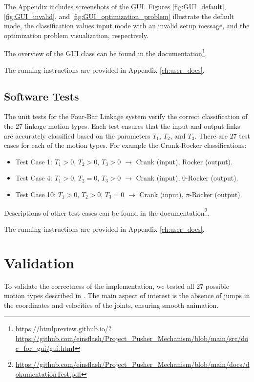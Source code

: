 \documentclass{article}
\begin{document}
The Appendix includes screenshots of the GUI. Figures \ref{fig:GUI_default}, \ref{fig:GUI_invalid}, and \ref{fig:GUI_optimization_problem} illustrate the default mode, the classification values input mode with an invalid setup message, and the optimization problem visualization, respectively.

The overview of the GUI class can be found in the documentation\footnote{\url{https://htmlpreview.github.io/?https://github.com/einsflash/Project_Pusher_Mechanism/blob/main/src/doc_for_gui/gui.html}}.

The running instructions are provided in Appendix \ref{ch:user_docs}.

\subsection{Software Tests}

The unit tests for the Four-Bar Linkage system verify the correct classification of the $27$ linkage motion types. Each test ensures that the input and output links are accurately classified based on the parameters $T_1$, $T_2$, and $T_3$. There are $27$ test cases for each of the motion types. For example the Crank-Rocker classifications:

\begin{itemize}
	\item Test Case 1: $T_1 > 0$, $T_2 > 0$, $T_3 > 0$ $\rightarrow$ Crank (input), Rocker (output).
	\item Test Case 4: $T_1 > 0$, $T_2 = 0$, $T_3 > 0$ $\rightarrow$ Crank (input), 0-Rocker (output).
	\item Test Case 10: $T_1 > 0$, $T_2 > 0$, $T_3 = 0$ $\rightarrow$ Crank (input), \(\pi\)-Rocker (output).
\end{itemize}

Descriptions of other test cases can be found in the documentation\footnote{\url{https://github.com/einsflash/Project_Pusher_Mechanism/blob/main/docs/dokumentationTest.pdf}}.

The running instructions are provided in Appendix \ref{ch:user_docs}.

\section{Validation}\label{ch:validation}

To validate the correctness of the implementation, we tested all $27$ possible motion types described in \cite{inproceedings}. The main aspect of interest is the absence of jumps in the coordinates and velocities of the joints, ensuring smooth animation. 
\end{document}
